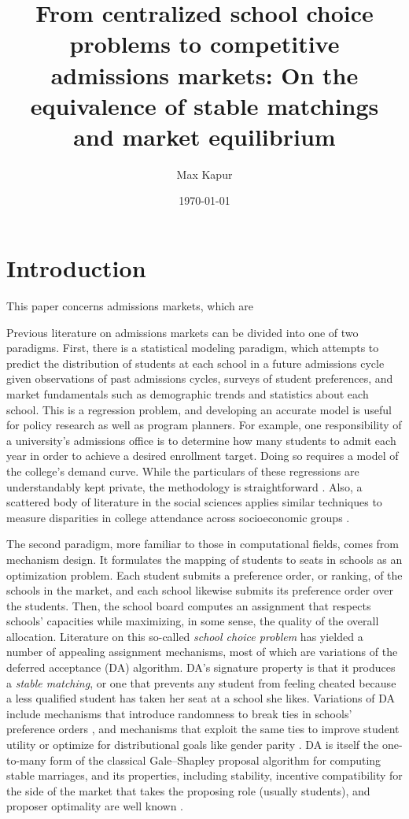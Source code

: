 \documentclass[12pt]{article}
\title{From centralized school choice problems to competitive admissions markets: On the equivalence of stable matchings and market equilibrium}
\date{\today}
\author{Max Kapur}
\theoremstyle{definition}
\begin{document}
\maketitle

\pagebreak
\tableofcontents

\pagebreak
\section{Introduction}
This paper concerns admissions markets, which are %

Previous literature on admissions markets can be divided into one of two paradigms. First, there is a statistical modeling paradigm, which attempts to predict the distribution of students at each school in a future admissions cycle given observations of past admissions cycles, surveys of student preferences, and market fundamentals such as demographic trends and statistics about each school. This is a regression problem, and developing an accurate model is useful for policy research as well as program planners. For example, one responsibility of a university's admissions office is to determine how many students to admit each year in order to achieve a desired enrollment target. Doing so requires a model of the college's demand curve. While the particulars of these regressions are understandably kept private, the methodology is straightforward \parencite{estimatingapplications}. Also, a scattered body of literature in the social sciences applies similar techniques to measure disparities in college attendance across socioeconomic groups \parencite[][]{consequencesofstructuralracism, roleofSESinSAT}.

The second paradigm, more familiar to those in computational fields, comes from mechanism design. It formulates the mapping of students to seats in schools as an optimization problem. Each student submits a preference order, or ranking, of the schools in the market, and each school likewise submits its preference order over the students. Then, the school board computes an assignment that respects schools' capacities while maximizing, in some sense, the quality of the overall allocation. Literature on this so-called \emph{school choice problem} has yielded a number of appealing assignment mechanisms, most of which are variations of the deferred acceptance (DA) algorithm. DA's signature property is that it produces a \emph{stable matching}, or one that prevents any student from feeling cheated because a less qualified student has taken her seat at a school she likes. Variations of DA include mechanisms that introduce randomness to break ties in schools' preference orders \parencite[][]{whatmatters}, and mechanisms that exploit the same ties to improve student utility \parencite[][]{expandingchoice} or optimize for distributional goals like gender parity \parencite[][]{distributionalgoals}. DA is itself the one-to-many form of the classical Gale--Shapley proposal algorithm for computing stable marriages, and its properties, including stability, incentive compatibility for the side of the market that takes the proposing role (usually students), and proposer optimality are well known \parencite[][]{galeshapley1962, economicsofmatching}. 
\end{document}
